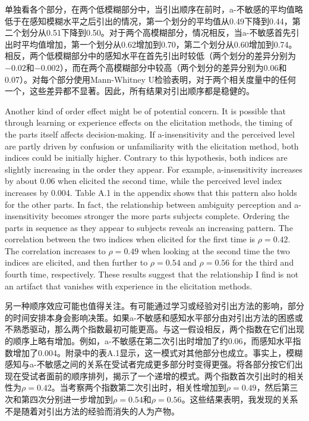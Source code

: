 \documentclass[12pt,a4paper]{article}
\newenvironment{original}
  {\par\medskip\noindent\color{black}\ignorespaces}
  {\par\medskip}
\newenvironment{translation}
  {\par\noindent\color{transblue}\ignorespaces}
  {\par\medskip\medskip}
\begin{document}
\begin{translation}
单独看各个部分，在两个低模糊部分中，当引出顺序在前时，a-不敏感的平均值略低于在感知模糊水平之后引出的情况，第一个划分的平均值从0.49下降到0.44，第二个划分从0.51下降到0.50。对于两个高模糊部分，情况相反，当a-不敏感首先引出时平均值增加，第一个划分从0.62增加到0.70，第二个划分从0.60增加到0.74。相反，两个低模糊部分中的感知水平在首先引出时较低（两个划分的差异分别为$-0.02$和$-0.002$），而在两个高模糊部分中较高（两个划分的差异分别为0.06和0.07）。对每个部分使用Mann-Whitney U检验表明，对于两个相关度量中的任何一个，这些差异都不显著。因此，所有结果对引出顺序都是稳健的。
\end{translation}

\begin{original}
Another kind of order effect might be of potential concern. It is possible that through learning or experience effects on the elicitation methods, the timing of the parts itself affects decision-making. If a-insensitivity and the perceived level are partly driven by confusion or unfamiliarity with the elicitation method, both indices could be initially higher. Contrary to this hypothesis, both indices are slightly increasing in the order they appear. For example, a-insensitivity increases by about 0.06 when elicited the second time, while the perceived level index increases by 0.004. Table A.1 in the appendix shows that this pattern also holds for the other parts. In fact, the relationship between ambiguity perception and a-insensitivity becomes stronger the more parts subjects complete. Ordering the parts in sequence as they appear to subjects reveals an increasing pattern. The correlation between the two indices when elicited for the first time is $\rho = 0.42$. The correlation increases to $\rho = 0.49$ when looking at the second time the two indices are elicited, and then further to $\rho = 0.54$ and $\rho = 0.56$ for the third and fourth time, respectively. These results suggest that the relationship I find is not an artifact that vanishes with experience in the elicitation methods.
\end{original}

\begin{translation}
另一种顺序效应可能也值得关注。有可能通过学习或经验对引出方法的影响，部分的时间安排本身会影响决策。如果a-不敏感和感知水平部分由对引出方法的困惑或不熟悉驱动，那么两个指数最初可能更高。与这一假设相反，两个指数在它们出现的顺序上略有增加。例如，a-不敏感在第二次引出时增加了约0.06，而感知水平指数增加了0.004。附录中的表A.1显示，这一模式对其他部分也成立。事实上，模糊感知与a-不敏感之间的关系在受试者完成更多部分时变得更强。将各部分按它们出现在受试者面前的顺序排列，揭示了一个递增的模式。两个指数首次引出时的相关性为$\rho = 0.42$。当考察两个指数第二次引出时，相关性增加到$\rho = 0.49$，然后第三次和第四次分别进一步增加到$\rho = 0.54$和$\rho = 0.56$。这些结果表明，我发现的关系不是随着对引出方法的经验而消失的人为产物。
\end{translation}
\end{document}
